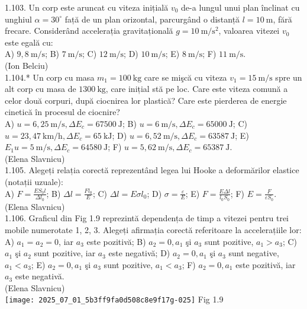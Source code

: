 1.103. Un corp este aruncat cu viteza inițială $v_{0}$ de-a lungul unui plan înclinat cu unghiul $\alpha=30^{\circ}$ față de un plan orizontal, parcurgând o distanță $l=10 \mathrm{~m}$, fără frecare. Considerând accelerația gravitațională $g=10 \mathrm{~m} / \mathrm{s}^{2}$, valoarea vitezei $v_{0}$ este egală cu:\\ A) $9,8 \mathrm{~m} / \mathrm{s}$; B) $7 \mathrm{~m} / \mathrm{s}$; C) $12 \mathrm{~m} / \mathrm{s}$; D) $10 \mathrm{~m} / \mathrm{s}$; E) $8 \mathrm{~m} / \mathrm{s}$; F) $11 \mathrm{~m} / \mathrm{s}$.\\ (Ion Belciu)\\

1.104.* Un corp cu masa $m_{1}=100 \mathrm{~kg}$ care se mişcă cu viteza $v_{1}=15 \mathrm{~m} / \mathrm{s}$ spre un alt corp cu masa de $1300 \mathrm{~kg}$, care inițial stă pe loc. Care este viteza comună a celor două corpuri, după ciocnirea lor plastică? Care este pierderea de energie cinetică în procesul de ciocnire?\\ A) $u=6,25 \mathrm{~m} / \mathrm{s}, \Delta E_{c}=67500 \mathrm{~J}$; B) $u=6 \mathrm{~m} / \mathrm{s}, \Delta E_{c}=65000 \mathrm{~J}$; C) $u=23,47 \mathrm{~km} / \mathrm{h}, \Delta E_{c}=65 \mathrm{~kJ}$; D) $u=6,52 \mathrm{~m} / \mathrm{s}, \Delta E_{c}=63587 \mathrm{~J}$; E) $E_{1} u=5 \mathrm{~m} / \mathrm{s}, \Delta E_{c}=64580 \mathrm{~J}$; F) $u=5,62 \mathrm{~m} / \mathrm{s}, \Delta E_{c}=65387 \mathrm{~J}$.\\ (Elena Slavnicu)\\

1.105. Alegeți relația corectă reprezentând legea lui Hooke a deformărilor elastice (notații uzuale):\\ A) $F=\frac{E S_{0} l}{\Delta l_{0}}$; B) $\Delta l=\frac{F l_{0}}{E}$; C) $\Delta l=E \sigma l_{0}$; D) $\sigma=\frac{\varepsilon}{E}$; E) $F=\frac{E \Delta l}{l_{0} S_{0}}$; F) $E=\frac{F}{\varepsilon S_{0}}$.\\ (Elena Slavnicu)\\

1.106. Graficul din Fig 1.9 reprezintă dependența de timp a vitezei pentru trei mobile numerotate 1, 2, 3. Alegeți afirmația corectă referitoare la accelerațiile lor:\\ A) $a_{1}=a_{2}=0$, iar $a_{3}$ este pozitivă; B) $a_{2}=0, a_{1}$ şi $a_{3}$ sunt pozitive, $a_{1}>a_{3}$; C) $a_{1}$ şi $a_{2}$ sunt pozitive, iar $a_{3}$ este negativă; D) $a_{2}=0, a_{1}$ şi $a_{3}$ sunt negative, $a_{1}<a_{3}$; E) $a_{2}=0, a_{1}$ şi $a_{3}$ sunt pozitive, $a_{1}<a_{3}$; F) $a_{2}=0, a_{1}$ este pozitivă, iar $a_{3}$ este negativă.\\ (Elena Slavnicu)\\ \texttt{[image: 2025\_07\_01\_5b3ff9fa0d508c8e9f17g-025]} Fig 1.9\\

